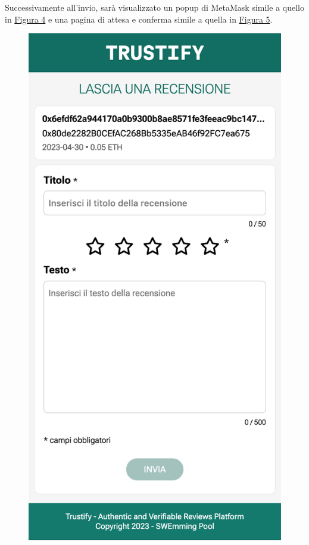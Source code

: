Successivamente all'invio, sarà visualizzato un popup di MetaMask simile a quello in \hyperref[fig:checkout_metamask]{Figura 4} e una pagina di attesa e conferma simile a quella in \hyperref[fig:checkout_conferma]{Figura 5}.

\begin{figure}[H]
      \includegraphics[width=\linewidth]{src/img/rilascio_recensione.png}

\end{figure}
